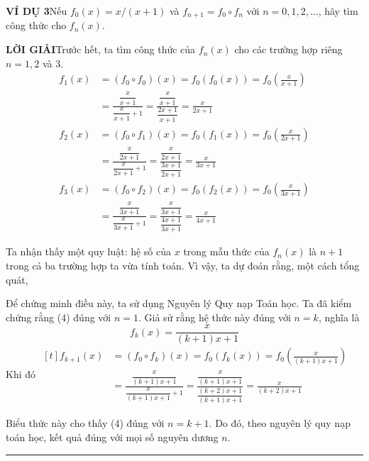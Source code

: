 \begin{minipage}[t]{0.71\textwidth}
    \noindent
    \textbf{\textsf{\color{stewartcyan}VÍ DỤ 3}}\quad Nếu $f_0(x) = x/(x + 1)$ và $f_{n+1} = f_0 \circ f_n$ với $n = 0, 1, 2, \dots$, hãy tìm công thức cho $f_n(x)$.

    \medskip
    \noindent
    \textbf{\textsf{\color{stewartcyan}LỜI GIẢI}}\quad Trước hết, ta tìm công thức của $f_n(x)$ cho các trường hợp riêng $n = 1, 2$ và $3$.
    \[\begin{aligned}
        f_1(x) &= (f_0 \circ f_0)(x) = f_0(f_0(x)) = f_0\left(\frac{x}{x + 1}\right) \\[6pt]
               &= \frac{\dfrac{x}{x + 1}}{\dfrac{x}{x + 1} + 1} = \frac{\dfrac{x}{x + 1}}{\dfrac{2x + 1}{x + 1}} = \frac{x}{2x + 1} \\[10pt]
        f_2(x) &= (f_0 \circ f_1)(x) = f_0(f_1(x)) = f_0\left(\frac{x}{2x + 1}\right) \\[6pt]
               &= \frac{\dfrac{x}{2x + 1}}{\dfrac{x}{2x + 1} + 1} = \frac{\dfrac{x}{2x + 1}}{\dfrac{3x + 1}{2x + 1}} = \frac{x}{3x + 1} \\[10pt]
        f_3(x) &= (f_0 \circ f_2)(x) = f_0(f_2(x)) = f_0\left(\frac{x}{3x + 1}\right) \\[6pt]
               &= \frac{\dfrac{x}{3x + 1}}{\dfrac{x}{3x + 1} + 1} = \frac{\dfrac{x}{3x + 1}}{\dfrac{4x + 1}{3x + 1}} = \frac{x}{4x + 1}
    \end{aligned}\]

    \noindent
    Ta nhận thấy một quy luật: hệ số của $x$ trong mẫu thức của $f_n(x)$ là $n + 1$ trong cả ba trường hợp ta vừa tính toán. Vì vậy, ta dự đoán rằng, một cách tổng quát,

    \medskip
    \noindent

    \medskip
    \noindent
    Để chứng minh điều này, ta sử dụng Nguyên lý Quy nạp Toán học. Ta đã kiểm chứng rằng (4) đúng với $n = 1$. Giả sử rằng hệ thức này đúng với $n = k$, nghĩa là
    \[
        f_k(x) = \frac{x}{(k + 1)x + 1}
    \]
    \noindent
    Khi đó\qquad
    $\begin{aligned}[t]
        f_{k+1}(x) &= (f_0 \circ f_k)(x) = f_0(f_k(x)) = f_0\left(\frac{x}{(k + 1)x + 1}\right) \\[6pt]
                   &= \frac{\dfrac{x}{(k + 1)x + 1}}{\dfrac{x}{(k + 1)x + 1} + 1} = \frac{\dfrac{x}{(k + 1)x + 1}}{\dfrac{(k + 2)x + 1}{(k + 1)x + 1}} = \frac{x}{(k + 2)x + 1}
    \end{aligned}$

    \medskip
    \noindent
    Biểu thức này cho thấy (4) đúng với $n = k + 1$. Do đó, theo nguyên lý quy nạp toán học, kết quả đúng với mọi số nguyên dương $n$.\hfill\textcolor{stewartcyan}{\rule{1.2ex}{1.2ex}}
\end{minipage}